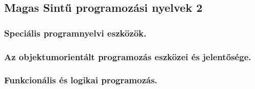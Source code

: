 \subsection{Magas Sintű programozási nyelvek 2}
\subsubsection{Speciális programnyelvi eszközök.}

\subsubsection{Az objektumorientált programozás eszközei és jelentősége.}

\subsubsection{Funkcionális és logikai programozás.}

